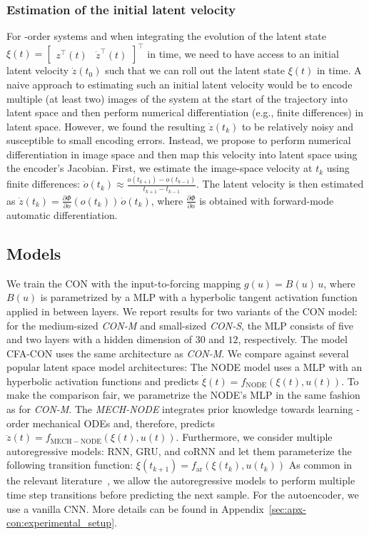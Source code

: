 \subsubsection{Estimation of the initial latent velocity}\label{sub:con:initial_latent_velocity_estimation}
For -order systems and when integrating the evolution of the latent state $\xi(t) = \begin{bmatrix}
    z^\top(t) & \dot{z}^\top(t)
\end{bmatrix}^\top$ in time, we need to have access to an initial latent velocity $\dot{z}(t_0)$ such that we can roll out the latent state $\xi(t)$ in time.
A naive approach to estimating such an initial latent velocity would be to encode multiple (at least two) images of the system at the start of the trajectory into latent space and then perform numerical differentiation (e.g., finite differences) in latent space. However, we found the resulting $\dot{z}(t_k)$ to be relatively noisy and susceptible to small encoding errors.
Instead, we propose to perform numerical differentiation in image space and then map this velocity into latent space using the encoder's Jacobian. First, we estimate the image-space velocity at $t_k$ using finite differences: $\dot{o}(t_k) \approx \frac{o(t_{k+1}) - o(t_{k-1})}{t_{k+1} - t_{k-1}}$. The latent velocity is then estimated as $\dot{z}(t_k) = \frac{\partial \Phi}{\partial o} (o(t_k)) \, \dot{o}(t_k)$, where $\frac{\partial \Phi}{\partial o}$ is obtained with forward-mode automatic differentiation.

\subsection{Models} 
We train the \gls{CON} with the input-to-forcing mapping $g(u) = B(u) \, u$, where $B(u)$ is parametrized by a \gls{MLP} with a hyperbolic tangent activation function applied in between layers. We report results for two variants of the \gls{CON} model: for the medium-sized \emph{CON-M} and small-sized \emph{CON-S}, the \gls{MLP} consists of five and two layers with a hidden dimension of $30$ and $12$, respectively. The model \gls{CFA-CON} uses the same architecture as \emph{CON-M}. We compare %
against several popular latent space model architectures:
The \gls{NODE} model uses a \gls{MLP} with an hyperbolic activation functions and predicts $\dot{\xi}(t) = f_\mathrm{NODE}(\xi(t), u(t))$. To make the comparison fair, we parametrize the NODE's \gls{MLP} in the same fashion as for \emph{CON-M}. The \emph{MECH-NODE} integrates prior knowledge towards learning -order mechanical \glspl{ODE} and, therefore, predicts $\ddot{z}(t) = f_\mathrm{MECH-NODE}(\xi(t), u(t))$. 
Furthermore, we consider multiple autoregressive models: \gls{RNN}, \gls{GRU}, and \gls{coRNN} and let them parameterize the following transition function: $\xi(t_{k+1}) = f_\mathrm{ar}(\xi(t_k), u(t_k))$
As common in the relevant literature~\citep{botev2021priors}, we allow the autoregressive models to perform multiple time step transitions before predicting the next sample.
For the autoencoder, we use a vanilla \gls{CNN}. More details can be found in Appendix~\ref{sec:apx-con:experimental_setup}.

